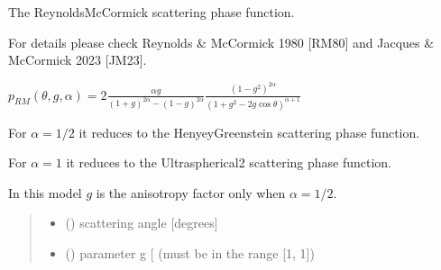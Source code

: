 \documentclass[letterpaper,10pt,english]{sphinxmanual}
\begin{document}
\begin{fulllineitems}
\label{\detokenize{06_anisotropy_factor:skinoptics.anisotropy_factor.ptheta_RM}}
\pysigstartsignatures
{}
\pysigstopsignatures
\begin{DUlineblock}{0em}
\item[] The Reynolds\sphinxhyphen{}McCormick scattering phase function.
\item[] For details please check Reynolds \& McCormick 1980 {[}RM80{]} and Jacques \& McCormick 2023 {[}JM23{]}.
\end{DUlineblock}

\sphinxAtStartPar
\(p_{RM}(\theta, g, \alpha) = 2 \frac{\alpha g}{(1 + g)^{2\alpha} - (1 - g)^{2\alpha}}\frac{(1 - g^2)^{2\alpha}}{(1 + g^2 - 2g\cos\theta)^{\alpha + 1}}\)

\begin{DUlineblock}{0em}
\item[] For \(\alpha = 1/2\) it reduces to the Henyey\sphinxhyphen{}Greenstein scattering phase function.
\item[] For \(\alpha = 1\) it reduces to the Ultraspherical\sphinxhyphen{}2 scattering phase function.
\end{DUlineblock}

\begin{DUlineblock}{0em}
\item[] In this model \(g\) is the anisotropy factor only when \(\alpha = 1/2\).
\end{DUlineblock}
\begin{quote}\begin{description}
\begin{itemize}
\item {} 
\sphinxAtStartPar
{} () \textendash{} scattering angle {[}degrees{]}

\item {} 
\sphinxAtStartPar
{} () \textendash{} parameter g {[}\sphinxhyphen{}{]} (must be in the range {[}\sphinxhyphen{}1, 1{]})


\end{itemize}
\end{description}
\end{quote}
\end{fulllineitems}
\end{document}
